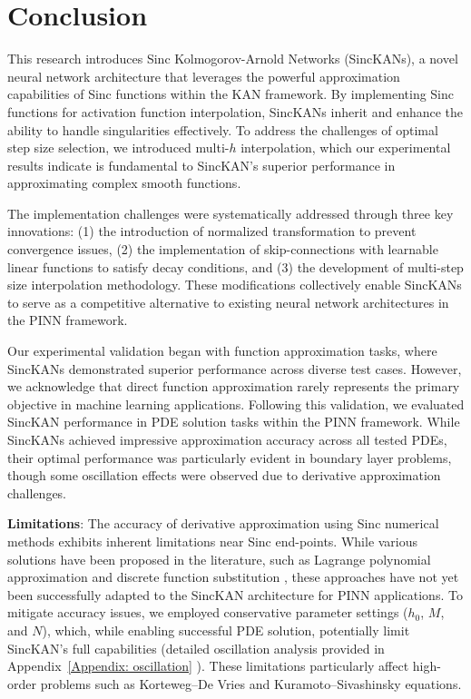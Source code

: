 \section{Conclusion}\label{Section: conclusion}
This research introduces Sinc Kolmogorov-Arnold Networks (SincKANs), a novel neural network architecture that leverages the powerful approximation capabilities of Sinc functions within the KAN framework. By implementing Sinc functions for activation function interpolation, SincKANs inherit and enhance the ability to handle singularities effectively. To address the challenges of optimal step size selection, we introduced multi-$h$
 interpolation, which our experimental results indicate is fundamental to SincKAN's superior performance in approximating complex smooth functions.

The implementation challenges were systematically addressed through three key innovations: (1) the introduction of normalized transformation to prevent convergence issues, (2) the implementation of skip-connections with learnable linear functions to satisfy decay conditions, and (3) the development of multi-step size interpolation methodology. These modifications collectively enable SincKANs to serve as a competitive alternative to existing neural network architectures in the PINN framework.

Our experimental validation began with function approximation tasks, where SincKANs demonstrated superior performance across diverse test cases. However, we acknowledge that direct function approximation rarely represents the primary objective in machine learning applications. Following this validation, we evaluated SincKAN performance in PDE solution tasks within the PINN framework. While SincKANs achieved impressive approximation accuracy across all tested PDEs, their optimal performance was particularly evident in boundary layer problems, though some oscillation effects were observed due to derivative approximation challenges.

\textbf{Limitations}: The accuracy of derivative approximation using Sinc numerical methods exhibits inherent limitations near Sinc end-points. While various solutions have been proposed in the literature, such as Lagrange polynomial approximation \citep{stenger2009polynomial} and discrete function substitution \citep{wu2006sinc}, these approaches have not yet been successfully adapted to the SincKAN architecture for PINN applications. To mitigate accuracy issues, we employed conservative parameter settings ($h_0$, $M$, and $N$), which, while enabling successful PDE solution, potentially limit SincKAN's full capabilities (detailed oscillation analysis provided in Appendix~\ref{Appendix: oscillation}
). These limitations particularly affect high-order problems such as Korteweg–De Vries and Kuramoto–Sivashinsky equations.

